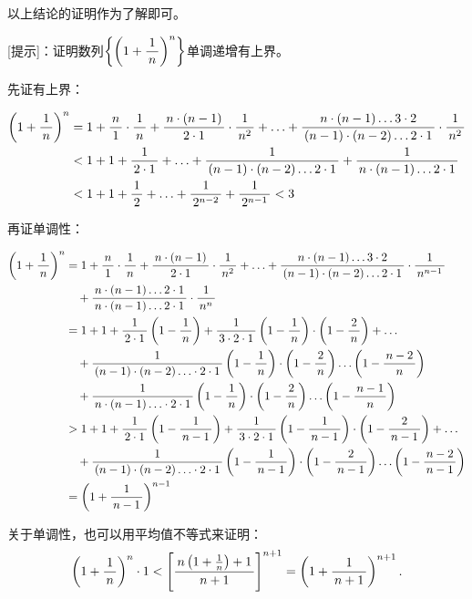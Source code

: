 \begin{shaded}

以上结论的证明作为了解即可。

[提示]：证明数列$\left\{\left(1+\df1n\right)^n\right\}$单调递增有上界。

先证有上界：

\begin{align}
	\left(1+\df1n\right)^n&=1+\df n1\cdot\df1n
	+\df{n\cdot(n-1)}{2\cdot1}\cdot\df1{n^2}+\ldots
	+\df{n\cdot(n-1)\ldots3\cdot2}{(n-1)\cdot(n-2)\ldots2\cdot1}\cdot\df1{n^2}\notag\\
	&<1+1+\df1{2\cdot1}+\ldots+\df1{(n-1)\cdot(n-2)\ldots2\cdot1}
	+\df1{n\cdot(n-1)\ldots2\cdot1}\notag\\
	&<1+1+\df12+\ldots+\df1{2^{n-2}}+\df1{2^{n-1}}<3\notag
\end{align}

再证单调性：

\begin{align}
	\left(1+\df1n\right)^n&=1+\df n1\cdot\df1n
	+\df{n\cdot(n-1)}{2\cdot1}\cdot\df1{n^2}+\ldots
	+\df{n\cdot(n-1)\ldots3\cdot2}{(n-1)\cdot(n-2)\ldots2\cdot1}
	\cdot\df1{n^{n-1}}\notag\\
	&\quad +\df{n\cdot(n-1)\ldots2\cdot1}{n\cdot(n-1)\ldots2\cdot1}
	\cdot\df1{n^{n}}\notag\\
	&=1+1+\df1{2\cdot 1}\left(1-\df1n\right)+\df1{3\cdot2\cdot
	1}\left(1-\df1n\right)\cdot\left(1-\df2n\right)+\ldots\notag\\
	&\quad +\df1{(n-1)\cdot(n-2)\ldots\cdot2\cdot
	1}\left(1-\df1n\right)\cdot\left(1-\df2n\right)
	\ldots\left(1-\df{n-2}n\right)\notag\\
	&\quad +\df1{n\cdot (n-1)\ldots\cdot2\cdot
	1}\left(1-\df1n\right)\cdot\left(1-\df2n\right)
	\ldots\left(1-\df{n-1}n\right)\notag\\
	&>1+1+\df1{2\cdot 1}\left(1-\df1{n-1}\right)+\df1{3\cdot2\cdot
	1}\left(1-\df1{n-1}\right)\cdot\left(1-\df2{n-1}\right)+\ldots\notag\\
	&\quad +\df1{(n-1)\cdot(n-2)\ldots\cdot2\cdot
	1}\left(1-\df1{n-1}\right)\cdot\left(1-\df2{n-1}\right)
	\ldots\left(1-\df{n-2}{n-1}\right)\notag\\
	&=\left(1+\df1{n-1}\right)^{n-1}\notag
\end{align}

关于单调性，也可以用平均值不等式来证明：
$$\left(1+\df1n\right)^n\cdot 1<
\left[\df{n\left(1+\frac1n\right)+1}{n+1}\right]^{n+1}
=\left(1+\df1{n+1}\right)^{n+1}.$$

\end{shaded}

